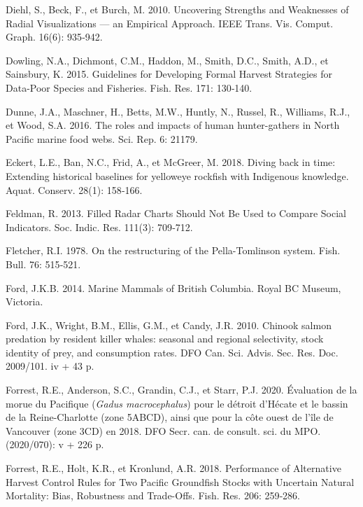 \documentclass[french,11pt]{book}
\begin{document}
\leavevmode\hypertarget{ref-diehl2010}{}%
Diehl, S., Beck, F., et Burch, M. 2010. Uncovering Strengths and Weaknesses of Radial Visualizations --- an Empirical Approach. IEEE Trans. Vis. Comput. Graph. 16(6): 935‑942.

\leavevmode\hypertarget{ref-dowling2015a}{}%
Dowling, N.A., Dichmont, C.M., Haddon, M., Smith, D.C., Smith, A.D., et Sainsbury, K. 2015. Guidelines for Developing Formal Harvest Strategies for Data-Poor Species and Fisheries. Fish. Res. 171: 130‑140.

\leavevmode\hypertarget{ref-dunne2016}{}%
Dunne, J.A., Maschner, H., Betts, M.W., Huntly, N., Russel, R., Williams, R.J., et Wood, S.A. 2016. The roles and impacts of human hunter-gathers in North Pacific marine food webs. Sci. Rep. 6: 21179.

\leavevmode\hypertarget{ref-eckert2018}{}%
Eckert, L.E., Ban, N.C., Frid, A., et McGreer, M. 2018. Diving back in time: Extending historical baselines for yelloweye rockfish with Indigenous knowledge. Aquat. Conserv. 28(1): 158‑166.

\leavevmode\hypertarget{ref-feldman2013}{}%
Feldman, R. 2013. Filled Radar Charts Should Not Be Used to Compare Social Indicators. Soc. Indic. Res. 111(3): 709‑712.

\leavevmode\hypertarget{ref-fletcher1978}{}%
Fletcher, R.I. 1978. On the restructuring of the Pella-Tomlinson system. Fish. Bull. 76: 515‑521.

\leavevmode\hypertarget{ref-ford2014}{}%
Ford, J.K.B. 2014. Marine Mammals of British Columbia. Royal BC Museum, Victoria.

\leavevmode\hypertarget{ref-ford2010}{}%
Ford, J.K., Wright, B.M., Ellis, G.M., et Candy, J.R. 2010. Chinook salmon predation by resident killer whales: seasonal and regional selectivity, stock identity of prey, and consumption rates. DFO Can. Sci. Advis. Sec. Res. Doc. 2009/101. iv + 43 p.

\leavevmode\hypertarget{ref-forrest2019}{}%
Forrest, R.E., Anderson, S.C., Grandin, C.J., et Starr, P.J. 2020. Évaluation de la morue du Pacifique (\emph{Gadus macrocephalus}) pour le détroit d'Hécate et le bassin de la Reine-Charlotte (zone 5ABCD), ainsi que pour la côte ouest de l'île de Vancouver (zone 3CD) en 2018. DFO Secr. can. de consult. sci. du MPO. (2020/070): v + 226 p.

\leavevmode\hypertarget{ref-forrest2018}{}%
Forrest, R.E., Holt, K.R., et Kronlund, A.R. 2018. Performance of Alternative Harvest Control Rules for Two Pacific Groundfish Stocks with Uncertain Natural Mortality: Bias, Robustness and Trade-Offs. Fish. Res. 206: 259‑286.
\end{document}
